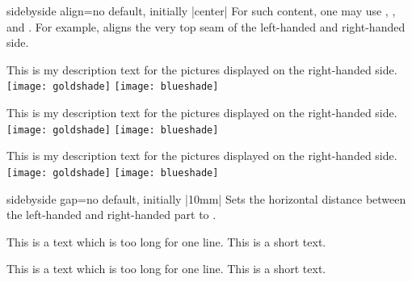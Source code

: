 \begin{docTcbKey}[][doc updated=2015-02-06]{sidebyside align}{=}{no default, initially |center|}
For such content, one may use , ,
and . For example,  aligns
the very top seam of the left-handed and right-handed side.


\begin{dispExample}

\begin{tcolorbox}[adjusted title=center seam,sidebyside align=center seam]
  This is my description text for the pictures displayed on the right-handed side.
  \tcblower
  \texttt{[image: goldshade]}%
  \texttt{[image: blueshade]}
\end{tcolorbox}

\begin{tcolorbox}[adjusted title=top seam,sidebyside align=top seam]
  This is my description text for the pictures displayed on the right-handed side.
  \tcblower
  \texttt{[image: goldshade]}%
  \texttt{[image: blueshade]}
\end{tcolorbox}

\begin{tcolorbox}[adjusted title=bottom seam,sidebyside align=bottom seam]
  This is my description text for the pictures displayed on the right-handed side.
  \tcblower
  \texttt{[image: goldshade]}%
  \texttt{[image: blueshade]}
\end{tcolorbox}
\end{dispExample}



\end{docTcbKey}

\clearpage
\begin{docTcbKey}{sidebyside gap}{=}{no default, initially |10mm|}
Sets the horizontal distance between the left-handed and right-handed part to
.
\begin{dispExample}

\begin{tcolorbox}[adjusted title=Wide gap,sidebyside gap=30mm]
This is a text which is too long for one line.
\tcblower
This is a short text.
\end{tcolorbox}\hfill
\begin{tcolorbox}[adjusted title=Narrow gap,sidebyside gap=1mm]
This is a text which is too long for one line.
\tcblower
This is a short text.
\end{tcolorbox}
\end{dispExample}
\end{docTcbKey}


